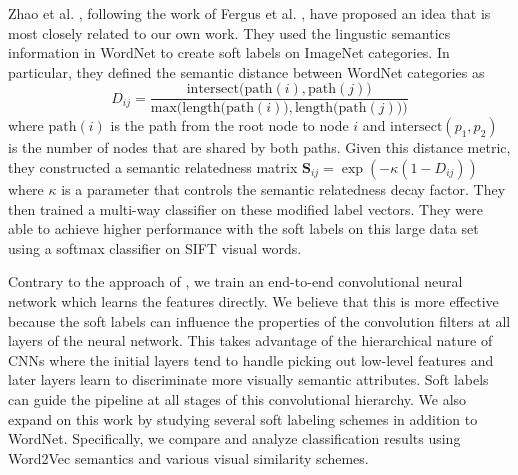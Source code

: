 Zhao et al. \cite{zhao2011large}, following the work of Fergus et al.
\cite{fergus2010semantic}, have proposed an idea that is most closely related
to our own work.
They used the lingustic semantics information in WordNet to create soft labels
on ImageNet categories. In particular, they defined the semantic distance
between WordNet categories as
\begin{equation}
\label{eq:wordnet_dist}
D_{ij} = \frac{\mathrm{intersect(path}(i), \mathrm{path}(j))}{\mathrm{max(length(path}(i)), \mathrm{length(path}(j)))}
\end{equation}
where $\mathrm{path}(i)$ is the path from the root node to node $i$ and
$\mathrm{intersect}(p_1, p_2)$ is the number of nodes that are shared by both
paths. Given this distance metric, they constructed a semantic relatedness
matrix $\mathbf{S}_{ij} = \exp(-\kappa(1-D_{ij}))$ where $\kappa$ is a
parameter that controls the semantic relatedness decay factor.
They then trained a multi-way classifier on these modified label vectors. They
were able to achieve higher performance with the soft labels on this large data
set using a softmax classifier on SIFT visual words.


Contrary to the approach of \cite{zhao2011large}, we train an end-to-end
convolutional neural network which learns the features directly.
We believe that this is more effective because the soft labels can influence
the properties of the convolution filters at all layers of the neural network.
This takes advantage of the hierarchical nature of CNNs where the initial
layers tend to handle picking out low-level features and later layers learn to
discriminate more visually semantic attributes. Soft labels can guide the
pipeline at all stages of this convolutional hierarchy.
We also expand on this work by studying several soft labeling schemes in
addition to WordNet. Specifically, we compare and analyze classification
results using Word2Vec semantics and various visual similarity schemes.
